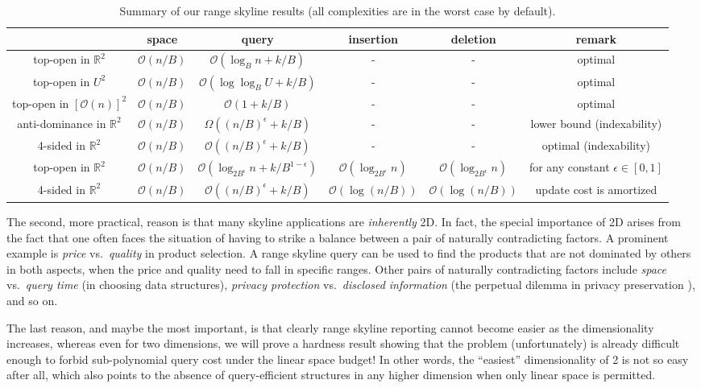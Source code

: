 \documentclass{sig-alternate}
\def\eps{\epsilon}
\def\real{\mathbb{R}}
\def\figcapup{\vspace{-1mm}}
\def\figcapdown{\vspace{-2mm}}
\def\eps{\epsilon}
\newcommand{\bigO}{\mathcal{O}}
\renewcommand{\(}{\left(}
\renewcommand{\)}{\right)}
\begin{document}
\begin{table*}
	\centering
\begin{tabular}{c|c|c|c|c|c}
		 & space & query & insertion & deletion & remark \\
		\hline
		top-open in $\real^2$ & $\bigO(n/B)$ & $\bigO(\log_B n + k/B)$ & - & - & optimal \\
		top-open in $U^2$ & $\bigO(n/B)$ & $\bigO(\log\log_B U + k/B)$ & - & - & optimal \\
		top-open in $[\bigO(n)]^2$ & $\bigO(n/B)$ & $\bigO(1 + k/B)$ & - & - & optimal \\
		\hline
		anti-dominance in $\real^2$ & $\bigO(n/B)$ & $\Omega((n/B)^\eps + k/B)$ & - & - & lower bound (indexability)\\
		4-sided in $\real^2$ & $\bigO(n/B)$ & $\bigO((n/B)^\eps + k/B)$ & - & - & optimal (indexability) \\
		\hline
    top-open in $\real^2$ & $\bigO(n/B)$ & $\bigO(\log_{2B^\eps} n +
    k/B^{1-\eps})$ & $\bigO(\log_{2B^\eps} n)$ & $\bigO(\log_{2B^\eps} n)$ &
    for any constant $\eps \in [0, 1]$ \\
		\hline
		4-sided in $\real^2$ & $\bigO(n/B)$ & $\bigO((n/B)^\eps + k/B)$ & $\bigO(\log (n/B))$ & $\bigO(\log (n/B))$ & update cost is amortized
	\end{tabular}
\figcapup
	\caption{Summary of our range skyline results (all complexities are in the worst case by default).} \label{tab:intro-results}
	\figcapdown
\end{table*}

The second, more practical, reason is that many skyline applications are {\em inherently} 2D. In fact, the special importance of 2D arises from the fact that one often faces the situation of having to strike a balance between a pair of naturally contradicting factors. A prominent example is {\em price} vs.\ {\em quality} in product selection. A range skyline query can be used to find the products that are not dominated by others in both aspects, when the price and quality need to fall in specific ranges. Other pairs of naturally contradicting factors include {\em space} vs.\ {\em query time} (in choosing data structures), {\em privacy protection} vs.\ {\em disclosed information} (the perpetual dilemma in privacy preservation \cite{CRL07}), and so on.

The last reason, and maybe the most important, is that clearly range skyline
reporting cannot become easier as the dimensionality increases, whereas even for
two dimensions, we will prove a hardness result showing that the problem
(unfortunately) is already difficult enough to forbid sub-polynomial
query cost under the linear space budget! In other words, the ``easiest''
dimensionality of 2 is not so easy after all, which also points to the absence
of query-efficient structures in any higher dimension
when only linear space is permitted.
\end{document}
